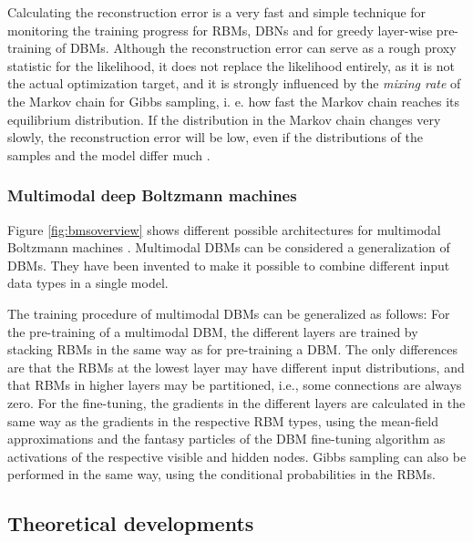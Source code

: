 \documentclass[12pt]{article}
\begin{document}
Calculating the reconstruction error  is a very fast and simple technique for monitoring the training progress for RBMs, DBNs and for greedy layer-wise pre-training of DBMs.
Although the reconstruction error can serve as a rough proxy statistic for the likelihood, it does not replace the likelihood entirely, as it is not the actual optimization target, and it is strongly influenced by the {\em mixing rate} of the Markov chain for Gibbs sampling, i. e. how fast the Markov chain reaches its equilibrium distribution. If the distribution in the Markov chain changes very slowly, the reconstruction error will be low, even if the distributions of the samples and the model differ much \citep{hinton_practical_2012}.

\subsubsection{Multimodal deep Boltzmann machines}

Figure \ref{fig:bmsoverview} shows different possible architectures for multimodal Boltzmann machines \citep{srivastava2012multimodal}.
Multimodal DBMs can be considered a generalization of DBMs.
They have been invented to make it possible to combine different input data types in a single model.

The training procedure of multimodal DBMs can be generalized as follows:
For the pre-training of a multimodal DBM, the different layers are trained by stacking RBMs in the same way as for pre-training a DBM.
The only differences are that the RBMs at the lowest layer may have different input distributions, and that RBMs in higher layers may be partitioned, i.e., some connections are always zero.
For the fine-tuning, the gradients in the different layers are calculated in the same way as the gradients in the respective RBM types, using the mean-field approximations and the fantasy particles of the DBM fine-tuning algorithm as activations of the respective visible and hidden nodes.
Gibbs sampling can also be performed in the same way, using the conditional probabilities in the RBMs.


\subsection{Theoretical developments}\label{bmaddtheory}
\end{document}
